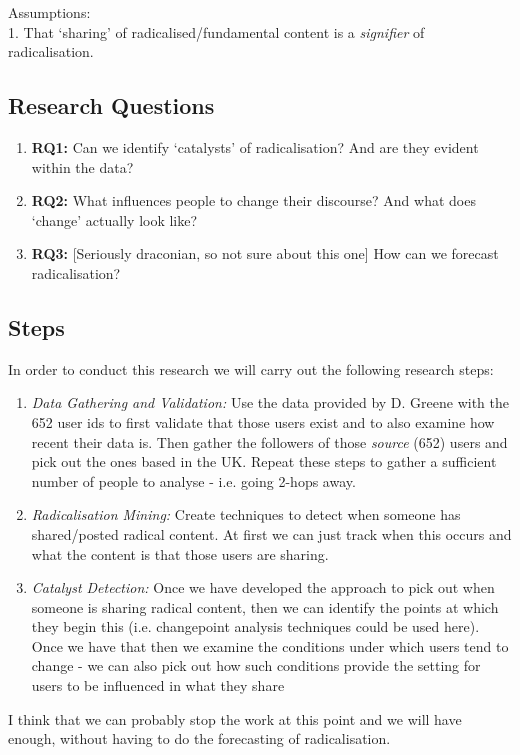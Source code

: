 \documentclass{acm_proc_article-sp}
\begin{document}
Assumptions:\\
1. That `sharing' of radicalised/fundamental content is a \emph{signifier} of radicalisation.\\

\subsection{Research Questions}
\begin{enumerate}
	\item \textbf{RQ1:} Can we identify `catalysts' of radicalisation? And are they evident within the data?
	\item \textbf{RQ2:} What influences people to change their discourse? And what does `change' actually look like?
	\item \textbf{RQ3:} [Seriously draconian, so not sure about this one] How can we forecast radicalisation? 
\end{enumerate}


\subsection{Steps}
In order to conduct this research we will carry out the following research steps:

\begin{enumerate}
	\item \emph{Data Gathering and Validation:} Use the data provided by D. Greene with the 652 user ids to first validate that those users exist and to also examine how recent their data is.
	Then gather the followers of those \emph{source} (652) users and pick out the ones based in the UK.
	Repeat these steps to gather a sufficient number of people to analyse - i.e. going 2-hops away.
	
	\item \emph{Radicalisation Mining:} Create techniques to detect when someone has shared/posted radical content.
	At first we can just track when this occurs and what the content is that those users are sharing.
	
	\item \emph{Catalyst Detection:} Once we have developed the approach to pick out when someone is sharing radical content, then we can identify the points at which they begin this (i.e. changepoint analysis techniques could be used here).
	Once we have that then we examine the conditions under which users tend to change - we can also pick out how such conditions provide the setting for users to be influenced in what they share
\end{enumerate}

I think that we can probably stop the work at this point and we will have enough, without having to do the forecasting of radicalisation.



%



\balancecolumns
\end{document}

